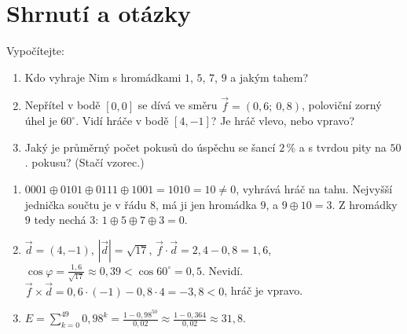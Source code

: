 \section{Shrnutí a otázky}

\begin{problem}
  Vypočítejte:
  \begin{enumerate}[label=(\alph*)]
    \item Kdo vyhraje Nim s hromádkami $1$, $5$, $7$, $9$ a jakým tahem?
    \item Nepřítel v bodě $[0, 0]$ se dívá ve směru $\vec{f} = (0{,}6;\ 0{,}8)$, poloviční zorný úhel je $60^\circ$. Vidí hráče v bodě $[4, -1]$? Je hráč vlevo, nebo vpravo?
    \item Jaký je průměrný počet pokusů do úspěchu se šancí $2\,\%$ a s tvrdou pity na $50$. pokusu? (Stačí vzorec.)
  \end{enumerate}
\end{problem}

\begin{solution}
  \begin{enumerate}[label=(\alph*)]
    \item $0001\oplus 0101\oplus 0111\oplus 1001 = 1010 = 10\neq 0$, vyhrává hráč na tahu. Nejvyšší jednička součtu je v řádu $8$, má ji jen hromádka $9$, a $9\oplus 10 = 3$. Z hromádky $9$ tedy nechá $3$: $1\oplus 5\oplus 7\oplus 3 = 0$.
    \item $\vec{d} = (4, -1)$, $|\vec{d}| = \sqrt{17}$, $\vec{f}\cdot\vec{d} = 2{,}4 - 0{,}8 = 1{,}6$, $\cos\varphi = \frac{1{,}6}{\sqrt{17}}\approx 0{,}39 < \cos 60^\circ = 0{,}5$. Nevidí. $\vec{f}\times\vec{d} = 0{,}6\cdot(-1) - 0{,}8\cdot 4 = -3{,}8 < 0$, hráč je vpravo.
    \item $E = \sum_{k=0}^{49}0{,}98^k = \frac{1 - 0{,}98^{50}}{0{,}02}\approx\frac{1 - 0{,}364}{0{,}02}\approx 31{,}8$.
  \end{enumerate}
\end{solution}

